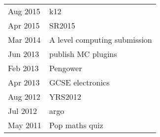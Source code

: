 
\begin{tabu} to \textwidth {X[1,l] X[5,l]}
    Aug 2015 & k12 \\
    Apr 2015 & SR2015 \\
    Mar 2014 & A level computing submission \\
    Jun 2013 & publish MC plugins \\
    Feb 2013 & Pengower \\
    Apr 2013 & GCSE electronics \\
    Aug 2012 & YRS2012 \\
    Jul 2012 & argo \\
    May 2011 & Pop maths quiz \\
\end{tabu}
